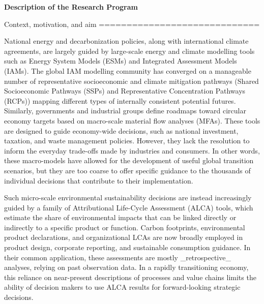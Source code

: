 \documentclass[compact]{nserc} %
\author{Guillaume Majeau-Bettez}
\begin{document}
\noindent \textbf{Description of the Research Program}

\begin{markdown}
%

%
%

Context, motivation, and aim
=============================

National energy and decarbonization policies, along with international climate agreements, are largely guided by large-scale energy and climate modelling tools such as Energy System Models (ESMs) and Integrated Assessment Models (IAMs). The global IAM modelling community has converged on a manageable number of representative socioeconomic and climate mitigation pathways (Shared Socioeconomic Pathways (SSPs) and Representative Concentration Pathways (RCPs)) mapping different types of internally consistent potential futures. Similarly, governments and industrial groups define roadmaps toward circular economy targets based on macro-scale material flow analyses (MFAs). These tools are designed to guide economy-wide decisions, such as national investment, taxation, and waste management policies. However, they lack the resolution to inform the everyday trade-offs made by industries and consumers. In other words, these macro-models have allowed for the development of useful global transition scenarios, but they are too coarse to offer specific guidance to the thousands of individual decisions that contribute to their implementation.

Such micro-scale environmental sustainability decisions are instead increasingly guided by a family of Attributional Life-Cycle Assessment (ALCA) tools, which estimate the share of environmental impacts that can be linked directly or indirectly to a specific product or function. Carbon footprints, environmental product declarations, and organizational LCAs are now broadly employed in product design, corporate reporting, and sustainable consumption guidance. In their common application, these assessments are mostly _retrospective_ analyses, relying on past observation data. In a rapidly transitioning economy, this reliance on near-present descriptions of processes and value chains limits the ability of decision makers to use ALCA results for forward-looking strategic decisions.


\end{markdown}
\end{document}
